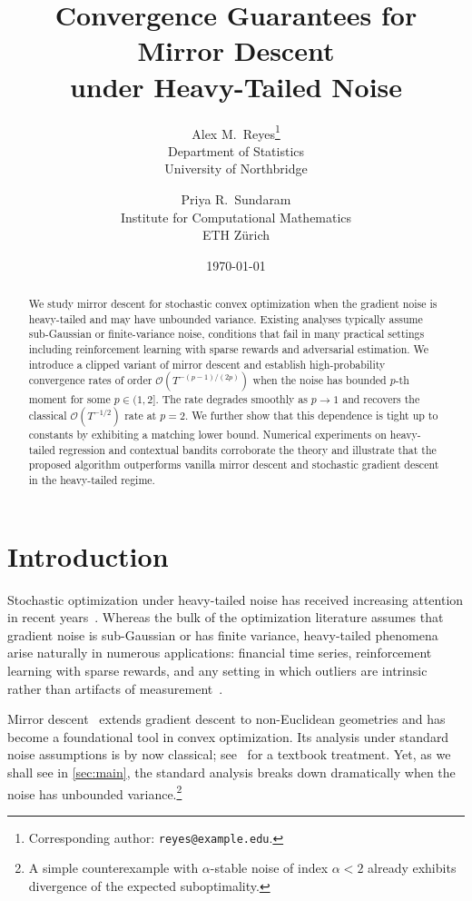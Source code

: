 \documentclass[11pt,a4paper]{article}
\title{Convergence Guarantees for Mirror Descent\\ under Heavy-Tailed Noise}
\author{
  Alex M.\ Reyes\thanks{Corresponding author: \texttt{reyes@example.edu}.} \\
  Department of Statistics \\
  University of Northbridge
  \and
  Priya R.\ Sundaram \\
  Institute for Computational Mathematics \\
  ETH Z\"urich
}
\date{\today}
\theoremstyle{plain}
\theoremstyle{definition}
\theoremstyle{remark}
\begin{document}
\maketitle

\begin{abstract}
We study mirror descent for stochastic convex optimization when the gradient
noise is heavy-tailed and may have unbounded variance. Existing analyses
typically assume sub-Gaussian or finite-variance noise, conditions that fail in
many practical settings including reinforcement learning with sparse rewards
and adversarial estimation. We introduce a clipped variant of mirror descent
and establish high-probability convergence rates of order
$\mathcal{O}(T^{-(p-1)/(2p)})$ when the noise has bounded $p$-th moment for some
$p \in (1, 2]$. The rate degrades smoothly as $p \to 1$ and recovers the
classical $\mathcal{O}(T^{-1/2})$ rate at $p = 2$. We further show that this
dependence is tight up to constants by exhibiting a matching lower bound.
Numerical experiments on heavy-tailed regression and contextual bandits
corroborate the theory and illustrate that the proposed algorithm outperforms
vanilla mirror descent and stochastic gradient descent in the heavy-tailed
regime.
\end{abstract}

\section{Introduction}
\label{sec:intro}

Stochastic optimization under heavy-tailed noise has received increasing
attention in recent years~\citep{nazin2019algorithms,gorbunov2020stochastic}.
Whereas the bulk of the optimization literature assumes that gradient noise is
sub-Gaussian or has finite variance, heavy-tailed phenomena arise naturally in
numerous applications: financial time series, reinforcement learning with
sparse rewards, and any setting in which outliers are intrinsic rather than
artifacts of measurement~\citep{cont2001empirical}.

Mirror descent~\citep{nemirovski1983problem,beck2003mirror} extends gradient
descent to non-Euclidean geometries and has become a foundational tool in
convex optimization. Its analysis under standard noise assumptions is by now
classical; see~\citep{bubeck2015convex} for a textbook treatment. Yet, as we
shall see in \cref{sec:main}, the standard analysis breaks down dramatically
when the noise has unbounded variance.\footnote{A simple counterexample with
$\alpha$-stable noise of index $\alpha < 2$ already exhibits divergence of the
expected suboptimality.}
\end{document}
